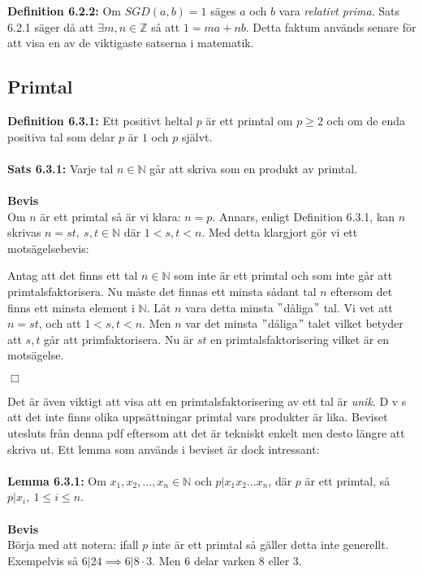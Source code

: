 \documentclass{article}
\begin{document}
\noindent
\textbf{Definition 6.2.2:} Om $SGD(a,b)=1$ säges $a$ och $b$ vara \textit{relativt prima}. Sats 6.2.1 säger då att $\exists m,n\in\mathbb{Z}$ så att $1=ma+nb$. Detta faktum används senare för att visa en av de viktigaste satserna i matematik.\\

\subsection{Primtal}
\textbf{Definition 6.3.1:} Ett positivt heltal $p$ är ett primtal om $p\geq2$ och om de enda positiva tal som delar $p$ är $1$ och $p$ självt.\\ \\
\textbf{Sats 6.3.1:} Varje tal $n\in\mathbb{N}$ går att skriva som en produkt av primtal.\\ \\
\textbf{Bevis}\\
Om $n$ är ett primtal så är vi klara: $n=p$. Annars, enligt Definition 6.3.1, kan $n$ skrivas $n=st, \ s,t\in\mathbb{N}$ där $1<s,t<n$. Med detta klargjort gör vi ett motsägelsebevis:

Antag att det finns ett tal $n\in\mathbb{N}$ som inte är ett primtal och som inte går att primtalsfaktorisera. Nu måste det finnas ett minsta sådant tal $n$ eftersom det finns ett minsta element i $\mathbb{N}$. Låt $n$ vara detta minsta $"$dåliga$"$ tal. Vi vet att $n=st$, och att $1<s,t<n$. Men $n$ var det minsta $"$dåliga$"$ talet vilket betyder att $s,t$ går att primfaktorisera. Nu är $st$ en primtalsfaktorisering vilket är en motsägelse.
\begin{flushright}
$\Box$
\end{flushright}
Det är även viktigt att visa att en primtalsfaktorisering av ett tal är \textit{unik}. D v s att det inte finns olika uppsättningar primtal vars produkter är lika. Beviset utesluts från denna pdf eftersom att det är tekniskt enkelt men desto längre att skriva ut. Ett lemma som används i beviset är dock intressant: \\ \\
\textbf{Lemma 6.3.1:} Om $x_1,x_2,...,x_n\in\mathbb{N}$ och $p|x_1x_2\hdots x_n$, där $p$ är ett primtal, så $p|x_i, \ 1\leq i \leq n$.\\ \\
\textbf{Bevis}\\
Börja med att notera: ifall $p$ inte är ett primtal så gäller detta inte generellt. Exempelvis så $6|24\implies 6|8\cdot3$. Men $6$ delar varken $8$ eller $3$.
\end{document}
